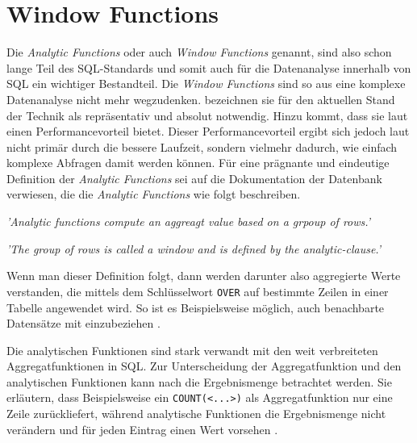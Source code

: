 \section{Window Functions}
\label{sec:window_functions} Die \textit{Analytic Functions} oder auch \textit{Window
Functions} genannt, sind also schon lange Teil des SQL-Standards und somit auch für
die Datenanalyse innerhalb von SQL ein wichtiger Bestandteil. Die \textit{Window
Functions} sind so aus eine komplexe Datenanalyse nicht mehr wegzudenken. \citet[Abstract]{cao2012optimization}
bezeichnen sie für den aktuellen Stand der Technik als repräsentativ und absolut
notwendig. Hinzu kommt, dass sie laut \citet[Kapitel 8]{kellenberger2019expert}
einen Performancevorteil bietet. Dieser Performancevorteil ergibt sich jedoch laut
\citet[Kapitel 8]{kellenberger2019expert} nicht primär durch die bessere Laufzeit,
sondern vielmehr dadurch, wie einfach komplexe Abfragen damit werden können. Für
eine prägnante und eindeutige Definition der \textit{Analytic Functions} sei auf
die Dokumentation der \citet{oracle} Datenbank verwiesen, die die \textit{Analytic
Functions} wie folgt beschreiben.
\begin{center}
	\textit{ 'Analytic functions compute an aggreagt value based on a grpoup of
	rows.' } \\ \citep{oracle}

	\textit{ 'The group of rows is called a window and is defined by the analytic-clause.'
	} \\ \citep{oracle}
\end{center}
Wenn man dieser Definition folgt, dann werden darunter also aggregierte Werte
verstanden, die mittels dem Schlüsselwort \texttt{OVER} auf bestimmte Zeilen in
einer Tabelle angewendet wird. So ist es Beispielsweise möglich, auch
benachbarte Datensätze mit einzubeziehen \citep{oracle}.

Die analytischen Funktionen sind stark verwandt mit den weit verbreiteten Aggregatfunktionen
in SQL. Zur Unterscheidung der Aggregatfunktion und den analytischen Funktionen
kann nach \citet{Nuijten2023} die Ergebnismenge betrachtet werden. Sie erläutern,
dass Beispielsweise ein \texttt{COUNT(<...>)} als Aggregatfunktion nur eine
Zeile zurückliefert, während analytische Funktionen die Ergebnismenge nicht verändern
und für jeden Eintrag einen Wert vorsehen \citep{Nuijten2023}.

